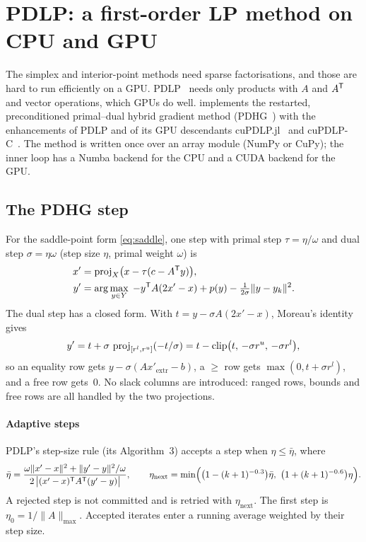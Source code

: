 \section{PDLP: a first-order LP method on CPU and GPU}\label{sec:pdlp}

The simplex and interior-point methods need sparse factorisations, and those are hard to run
efficiently on a GPU. PDLP~\cite{applegate2021} needs only products with $A$ and $A^{\mathsf{T}}$ and vector
operations, which GPUs do well.  implements the restarted, preconditioned
primal--dual hybrid gradient method (PDHG~\cite{chambolle2011}) with the enhancements of PDLP and of
its GPU descendants cuPDLP.jl~\cite{lu2023cupdlp} and cuPDLP-C~\cite{lu2023cupdlpc}. The method is
written once over an array module (NumPy or CuPy); the inner loop has a Numba backend for the CPU
and a CUDA backend for the GPU.

\subsection{The PDHG step}
For the saddle-point form \eqref{eq:saddle}, one step with primal step $\tau=\eta/\omega$ and dual
step $\sigma=\eta\omega$ (step size $\eta$, primal weight $\omega$) is
\begin{align}
  x' &= \operatorname{proj}_X\bigl(x-\tau(c-A^{\mathsf{T}} y)\bigr),\label{eq:pdhg-x}\\
  y' &= \arg\max_{y\in Y}\; -y^{\mathsf{T}} A(2x'-x) + p(y) - \tfrac{1}{2\sigma}\|y-y_k\|^2 .\label{eq:pdhg-y}
\end{align}
The dual step has a closed form. With $t=y-\sigma A(2x'-x)$, Moreau's identity gives
\begin{equation}\label{eq:moreau}
  y' = t + \sigma\,\operatorname{proj}_{[r^l,r^u]}(-t/\sigma) = t - \operatorname{clip}\bigl(t,\,-\sigma r^u,\,-\sigma r^l\bigr),
\end{equation}
so an equality row gets $y-\sigma(Ax'_{\text{extr}}-b)$, a $\ge$ row gets $\max(0,t+\sigma r^l)$, and a
free row gets~$0$. No slack columns are introduced: ranged rows, bounds and free rows are all
handled by the two projections.

\paragraph{Adaptive steps}
PDLP's step-size rule (its Algorithm~3) accepts a step when $\eta\le\bar\eta$, where
\begin{equation}\label{eq:pdlp-step}
  \bar\eta = \frac{\omega\|x'-x\|^2+\|y'-y\|^2/\omega}{2\,\bigl|(x'-x)\T A\T(y'-y)\bigr|},\qquad
  \eta_{\text{next}} = \min\Bigl(\bigl(1-(k+1)^{-0.3}\bigr)\bar\eta,\ \bigl(1+(k+1)^{-0.6}\bigr)\eta\Bigr).
\end{equation}
A rejected step is not committed and is retried with $\eta_{\text{next}}$. The first step is
$\eta_0=1/\|A\|_{\max}$. Accepted iterates enter a running average weighted by their step size.

